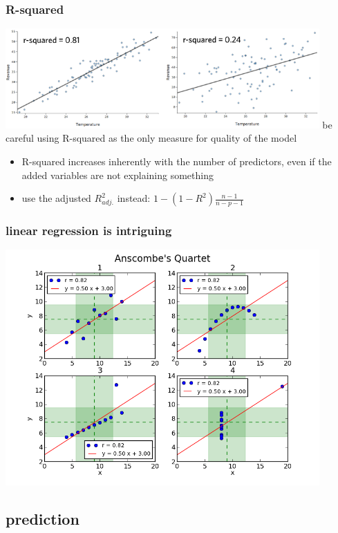 \documentclass{beamer}
\begin{document}
\begin{frame}
\frametitle{R-squared}
\includegraphics[width = 0.9\textwidth]{figures/03/Good-and-bad-fits2.png}
\newline
be careful using R-squared as the only measure for quality of the model
\begin{itemize}
\item R-squared increases inherently with the number of predictors, even if the added variables are not explaining something
\item use the adjusted $R^2_{adj.}$ instead: $1-(1-R^2)\frac{n-1}{n-p-1}$
\end{itemize}
\end{frame}

\begin{frame}
\frametitle{linear regression is intriguing}
\includegraphics[width = 0.9\textwidth]{figures/03/anscombe.png}
\newline
\end{frame}


\subsection{prediction}
\end{document}
